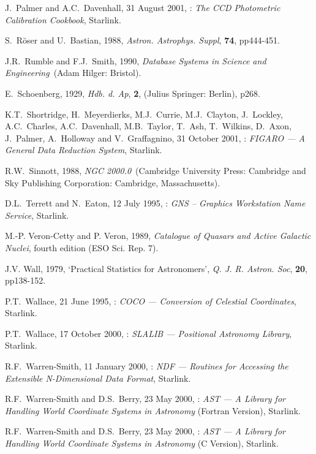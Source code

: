 \documentclass[twoside,11pt]{starlink}
\begin{document}
\begin{thebibliography}{99}
   J.~Palmer and A.C.~Davenhall, 31 August 2001,
   : \textit{The CCD Photometric Calibration Cookbook},
   Starlink.

   S.~R\"{o}ser and U.~Bastian, 1988, \textit{Astron.
   Astrophys. Suppl}, \textbf{74}, pp444-451.

   J.R.~Rumble and F.J.~Smith, 1990, \textit{Database
   Systems in Science and Engineering}\, (Adam Hilger: Bristol).

   E.~Schoenberg, 1929, \textit{Hdb. d. Ap}, \textbf{2},
   (Julius Springer: Berlin), p268.

   K.T.~Shortridge, H.~Meyerdierks, M.J.~Currie,
   M.J.~Clayton, J.~Lockley, A.C.~Charles, A.C.~Davenhall, M.B.~Taylor,
   T.~Ash, T.~Wilkins, D.~Axon, J.~Palmer, A.~Holloway and V.~Graffagnino,
   31 October 2001, : \textit{FIGARO --- A General
   Data Reduction System}, Starlink.

   R.W.~Sinnott, 1988, \textit{NGC 2000.0}\, (Cambridge
   University Press: Cambridge and Sky Publishing Corporation: Cambridge,
   Massachusetts).

   D.L.~Terrett and N.~Eaton, 12 July 1995,
   : \textit{GNS -- Graphics Workstation Name Service},
   Starlink.

   M.-P. Veron-Cetty and P. Veron, 1989, \textit{Catalogue
   of Quasars and Active Galactic Nuclei}, fourth edition (ESO Sci. Rep. 7).

   J.V. Wall, 1979, `Practical Statistics for
   Astronomers', \textit{Q. J. R. Astron. Soc}, \textbf{20},
   pp138-152.

   P.T.~Wallace, 21 June 1995, :
   \textit{COCO --- Conversion of Celestial Coordinates}, Starlink.

   P.T.~Wallace, 17 October 2000, :
   \textit{SLALIB --- Positional Astronomy Library}, Starlink.

   R.F.~Warren-Smith, 11 January 2000,
   : \textit{NDF --- Routines for Accessing the
   Extensible N-Dimensional Data Format}, Starlink.

   R.F.~Warren-Smith and D.S.~Berry, 23 May 2000,
   : \textit{AST --- A Library for Handling World
   Coordinate Systems in Astronomy}\/ (Fortran Version), Starlink.

   R.F.~Warren-Smith and D.S.~Berry, 23 May 2000,
   : \textit{AST --- A Library for Handling World
   Coordinate Systems in Astronomy}\/ (C Version), Starlink.

\end{thebibliography}
\end{document}

